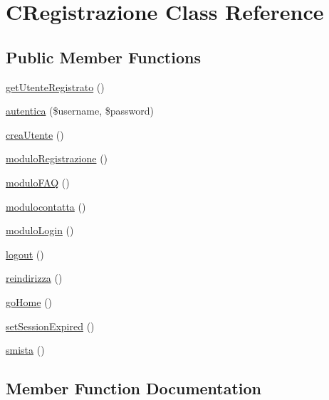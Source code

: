 \hypertarget{class_c_registrazione}{}\section{C\+Registrazione Class Reference}
\label{class_c_registrazione}
\subsection*{Public Member Functions}
\begin{DoxyCompactItemize}
\item 
\mbox{\hyperlink{class_c_registrazione_afb36997fb0d21c191a0c8ded20289345}{get\+Utente\+Registrato}} ()
\item 
\mbox{\hyperlink{class_c_registrazione_ad9d15b83f98741bc5c911de597911bdf}{autentica}} (\$username, \$password)
\item 
\mbox{\hyperlink{class_c_registrazione_a856bf1b9957683ffdd9b39b7df78176f}{crea\+Utente}} ()
\item 
\mbox{\hyperlink{class_c_registrazione_a0387e390a24bd1493f47a9de42dd52e3}{modulo\+Registrazione}} ()
\item 
\mbox{\hyperlink{class_c_registrazione_a074b38d1bcc227610ebef060d3ce7b02}{modulo\+F\+AQ}} ()
\item 
\mbox{\hyperlink{class_c_registrazione_a25af891e9bcd187b61f857f6ebd6fc08}{modulocontatta}} ()
\item 
\mbox{\hyperlink{class_c_registrazione_ad172b8a64a14fdb3e2e8a3e964fefaed}{modulo\+Login}} ()
\item 
\mbox{\hyperlink{class_c_registrazione_a082405d89acd6835c3a7c7a08a7adbab}{logout}} ()
\item 
\mbox{\hyperlink{class_c_registrazione_a29bdc8fd7986f73f25db00b8461b1555}{reindirizza}} ()
\item 
\mbox{\hyperlink{class_c_registrazione_a6b0bd8f7f5761d0f1a61f4dfb7770a62}{go\+Home}} ()
\item 
\mbox{\hyperlink{class_c_registrazione_aee0ceb27c20213e8f77ae843cd1c0176}{set\+Session\+Expired}} ()
\item 
\mbox{\hyperlink{class_c_registrazione_afc7ba180569cef3535974cfc4a1211f1}{smista}} ()
\end{DoxyCompactItemize}


\subsection{Member Function Documentation}
\mbox{\label{class_c_registrazione_ad9d15b83f98741bc5c911de597911bdf}} 
